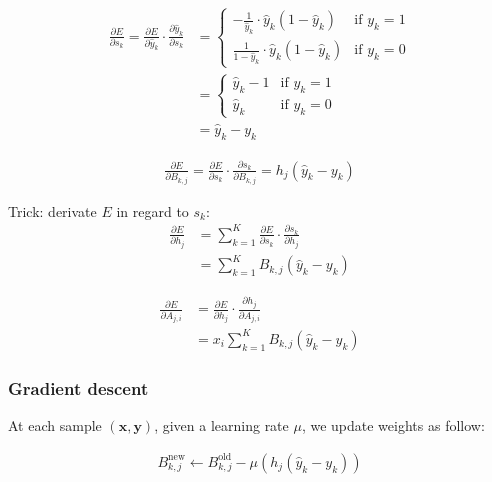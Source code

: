 \begin{align}
	\frac{ \partial E } { \partial s_k } 
		=  
		\frac{ \partial E } { \partial \hat y_k } \cdot \frac{ \partial \hat y_k } { \partial s_k } 
		&=
		\left\{
		    \begin{array}{ll}
		        - \frac{1}{\hat y_k} \cdot \hat y_k (1 - \hat y_k)& \mbox{if } y_k =1 \\
		        \frac{1}{1 - \hat y_k} \cdot \hat y_k (1 - \hat y_k)& \mbox{if } y_k =0
		    \end{array}
		\right. \\
		&=
		\left\{
		    \begin{array}{ll}
		       \hat y_k - 1 & \mbox{if } y_k =1 \\
		       \hat y_k & \mbox{if } y_k =0
		    \end{array}
		\right. \\
		&= \hat y_k - y_k
\end{align}



\begin{align}
	\frac{\partial E}{\partial B_{k, j}} 
	= 
	\frac{\partial E}{\partial s_k} \cdot \frac{\partial s_k}{\partial B_{k, j}} 
	= 
	h_j (\hat y_k - y_k)
\end{align}


Trick: derivate $E$ in regard to $s_k$:
\begin{align}
	\frac{\partial E}{\partial h_j} 
	&= 
	\sum_{k=1}^K \frac{\partial E}{\partial s_k} \cdot \frac{\partial s_k}{\partial h_j} \\
	&= 
	\sum_{k=1}^K B_{k, j} (\hat y_k - y_k)
\end{align}


\begin{align}
	\frac{\partial E}{\partial A_{j,i}} 
	&= 
	\frac{\partial E}{\partial h_j} \cdot \frac{\partial h_j}{\partial A_{j, i}} \\
	&= 
	x_i \sum_{k=1}^K B_{k, j} (\hat y_k - y_k)
\end{align}


\subsubsection*{Gradient descent}

At each sample $(\mathbf{x}, \mathbf{y})$, given a learning rate $\mu$, we update weights as follow:

\begin{align}
	B_{k, j}^{\mbox{new}} \leftarrow B_{k,j}^{\mbox{old}} - \mu (h_j (\hat y_k - y_k))
\end{align}

